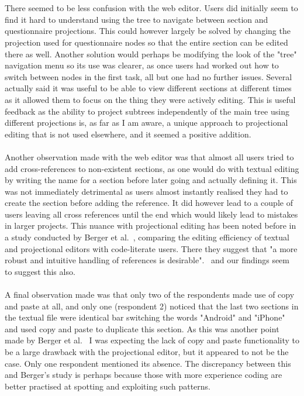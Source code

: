 \documentclass{article}
\begin{document}
{\\
\\
There seemed to be less confusion with the web editor. Users did initially seem to find it hard to understand using the tree to navigate between section and questionnaire projections. This could however largely be solved by changing the projection used for questionnaire nodes so that the entire section can be edited there as well. Another solution would perhaps be modifying the look of the "tree" navigation menu so its use was clearer, as once users had worked out how to switch between nodes in the first task, all but one had no further issues. Several actually said it was useful to be able to view different sections at different times as it allowed them to focus on the thing they were actively editing. This is useful feedback as the ability to project subtrees independently of the main tree using different projections is, as far as I am aware, a unique approach to projectional editing that is not used elsewhere, and it seemed a positive addition.
\\
\\
Another observation made with the web editor was that almost all users tried to add cross-references to non-existent sections, as one would do with textual editing by writing the name for a section before later going and actually defining it. This was not immediately detrimental as users almost instantly realised they had to create the section before adding the reference. It did however lead to a couple of users leaving all cross references until the end which would likely lead to mistakes in larger projects. This nuance with projectional editing has been noted before in a study conducted by Berger et al.~\cite{projEditControlledExperiment}, comparing the editing efficiency of textual and projectional editors with code-literate users. There they suggest that "a more robust and intuitive handling of references is desirable".~\cite[pg. 9]{projEditControlledExperiment} and our findings seem to suggest this also.
\\
\\
A final observation made was that only two of the respondents made use of copy and paste at all, and only one (respondent 2) noticed that the last two sections in the textual file were identical bar switching the words "Android" and "iPhone" and used copy and paste to duplicate this section. As this was another point made by Berger et al.~\cite{projEditControlledExperiment} I was expecting the lack of copy and paste functionality to be a large drawback with the projectional editor, but it appeared to not be the case. Only one respondent mentioned its absence. The discrepancy between this and Berger's study is perhaps because those with more experience coding are better practised at spotting and exploiting such patterns.

}
\end{document}
